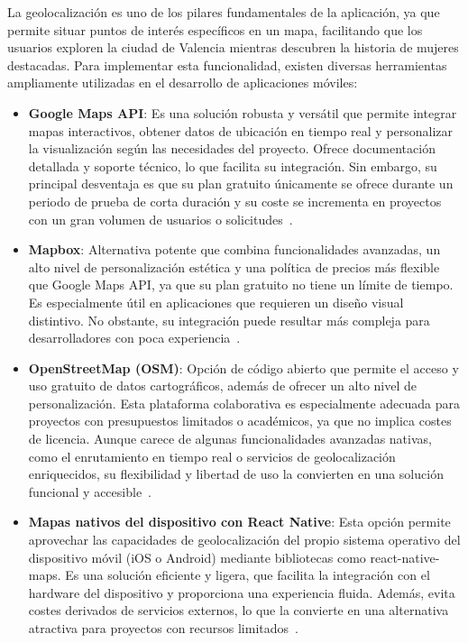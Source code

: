 La geolocalización es uno de los pilares fundamentales de la aplicación, ya que permite situar puntos de interés específicos en un mapa, facilitando que los usuarios exploren la ciudad de Valencia mientras descubren la historia de mujeres destacadas. Para implementar esta funcionalidad, existen diversas herramientas ampliamente utilizadas en el desarrollo de aplicaciones móviles:

\begin{itemize}
    \item \textbf{Google Maps API}: Es una solución robusta y versátil que permite integrar mapas interactivos, obtener datos de ubicación en tiempo real y personalizar la visualización según las necesidades del proyecto. Ofrece documentación detallada y soporte técnico, lo que facilita su integración. Sin embargo, su principal desventaja es que su plan gratuito únicamente se ofrece durante un periodo de prueba de corta duración y su coste se incrementa en proyectos con un gran volumen de usuarios o solicitudes~\cite{googlemaps2024}.
    \item \textbf{Mapbox}: Alternativa potente que combina funcionalidades avanzadas, un alto nivel de personalización estética y una política de precios más flexible que Google Maps API, ya que su plan gratuito no tiene un límite de tiempo. Es especialmente útil en aplicaciones que requieren un diseño visual distintivo. No obstante, su integración puede resultar más compleja para desarrolladores con poca experiencia~\cite{mapbox2024}.
    \item \textbf{OpenStreetMap (OSM)}: Opción de código abierto que permite el acceso y uso gratuito de datos cartográficos, además de ofrecer un alto nivel de personalización. Esta plataforma colaborativa es especialmente adecuada para proyectos con presupuestos limitados o académicos, ya que no implica costes de licencia. Aunque carece de algunas funcionalidades avanzadas nativas, como el enrutamiento en tiempo real o servicios de geolocalización enriquecidos, su flexibilidad y libertad de uso la convierten en una solución funcional y accesible~\cite{osm2024}.
    \item \textbf{Mapas nativos del dispositivo con React Native}: Esta opción permite aprovechar las capacidades de geolocalización del propio sistema operativo del dispositivo móvil (iOS o Android) mediante bibliotecas como react-native-maps. Es una solución eficiente y ligera, que facilita la integración con el hardware del dispositivo y proporciona una experiencia fluida. Además, evita costes derivados de servicios externos, lo que la convierte en una alternativa atractiva para proyectos con recursos limitados~\cite{reactnativemaps2024}.
\end{itemize}

